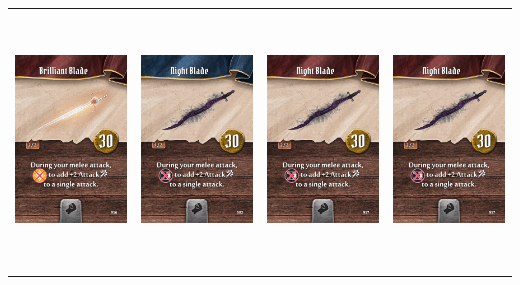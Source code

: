 \documentclass{minimal}
\begin{document}
{\begin{longtable}{llll}
\includegraphics[width=44mm,height=68mm]{./64-151/gh-081b-brilliant-blade.png} &
\includegraphics[width=44mm,height=68mm]{./64-151/gh-082a-night-blade.png} &
\includegraphics[width=44mm,height=68mm]{./64-151/gh-082b-night-blade.png} &
\includegraphics[width=44mm,height=68mm]{./64-151/gh-082b-night-blade.png}\\ 

\end{longtable}}
\end{document}
